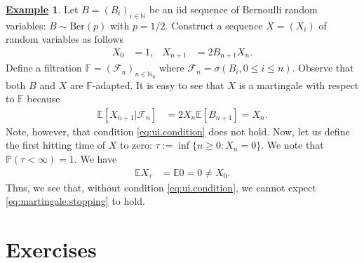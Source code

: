 \documentclass[12pt]{book}
\numberwithin{equation}{chapter}
\theoremstyle{plain}
\newtheorem{theorem}{\underline{Theorem}}
\numberwithin{theorem}{section}
\theoremstyle{definition}
\newtheorem{example}[theorem]{\underline{Example}}
\numberwithin{exercise}{chapter}
\newcommand{\<}{\langle}
\renewcommand{\>}{\rangle}
\renewcommand{\(}{\left(}
\renewcommand{\)}{\right)}
\renewcommand{\[}{\left[}
\renewcommand{\]}{\right]}
\newcommand\Eb{\mathds{E}}
\newcommand\Fb{\mathds{F}}
\newcommand\Pb{\mathds{P}}
\newcommand\Nb{\mathds{N}}
\newcommand\Fc{\mathscr{F}}
\newcommand\sig{\sigma}
\begin{document}
\begin{example}
Let $B=(B_i)_{i \in \Nb}$ be an iid sequence of Bernoulli random variables: $B \sim \text{Ber}(p)$ with $p = 1/2$.  Construct a sequence $X = (X_i)$ of random variables as follows
\begin{align}
X_0
	&=	1 , &
X_{n+1}
	&=	2 B_{n+1} X_n .
\end{align}
Define a filtration $\Fb = (\Fc_n)_{n \in \Nb_0}$ where $\Fc_n = \sig( B_i, 0 \leq i \leq n)$.  Observe that both $B$ and $X$ are $\Fb$-adapted.  It is easy to see that $X$ is a martingale with respect to $\Fb$ because
\begin{align}
\Eb[ X_{n+1} | \Fc_n ]
	&=	2 X_n \Eb[ B_{n+1} ]
	=		X_n .
\end{align}
Note, however, that condition \eqref{eq:ui.condition} does not hold.  Now, let us define the first hitting time of $X$ to zero: $\tau := \inf \{ n \geq 0 : X_n = 0  \}$.  We note that $\Pb(\tau < \infty ) = 1$.  We have
\begin{align}
\Eb X_\tau
	&=	\Eb 0
	=		0 \neq X_0 .
\end{align}
Thus, we see that, without condition \eqref{eq:ui.condition}, we cannot expect \eqref{eq:martingale.stopping} to hold.
\end{example}


%


\section{Exercises}
\label{sec:exercises-2}
\end{document}
